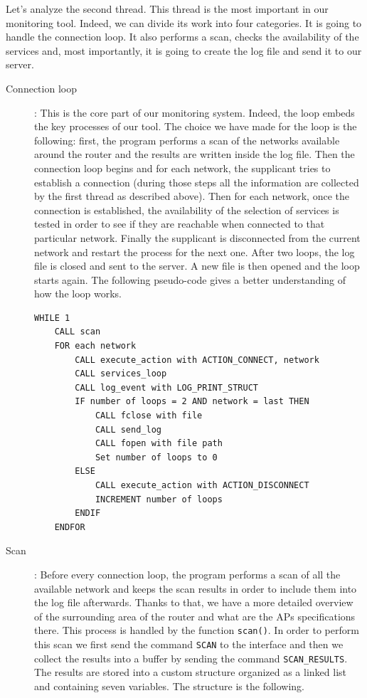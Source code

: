 Let's analyze the second thread. This thread is the most important in our monitoring tool. Indeed, we can divide its work into four categories. It is going to handle the connection loop. It also performs a scan, checks the availability of the services and, most importantly, it is going to create the log file and send it to our server. 

\begin{description}
	\item[Connection loop]: This is the core part of our monitoring system. Indeed, the loop embeds the key processes of our tool. The choice we have made for the loop is the following: first, the program performs a scan of the networks available around the router and the results are written inside the log file. Then the connection loop begins and for each network, the supplicant tries to establish a connection (during those steps all the information are collected by the first thread as described above). Then for each network, once the connection is established, the availability of the selection of services is tested in order to see if they are reachable when connected to that particular network. Finally the supplicant is disconnected from the current network and restart the process for the next one. After two loops, the log file is closed and sent to the server. A new file is then opened and the loop starts again. The following pseudo-code gives a better understanding of how the loop works.\\

\begin{lstlisting}[frame=single,breaklines=true,caption={Connection loop pseudo-code}]
WHILE 1
	CALL scan
	FOR each network
		CALL execute_action with ACTION_CONNECT, network
		CALL services_loop
		CALL log_event with LOG_PRINT_STRUCT
		IF number of loops = 2 AND network = last THEN
			CALL fclose with file
			CALL send_log
			CALL fopen with file path
			Set number of loops to 0
		ELSE
			CALL execute_action with ACTION_DISCONNECT
			INCREMENT number of loops
		ENDIF
	ENDFOR
\end{lstlisting}

	\item[Scan]: Before every connection loop, the program performs a scan of all the available network and keeps the scan results in order to include them into the log file afterwards. Thanks to that, we have a more detailed overview of the surrounding area of the router and what are the APs specifications there. This process is handled by the function \texttt{scan()}. In order to perform this scan we first send the command \texttt{SCAN} to the interface and then we collect the results into a buffer by sending the command \texttt{SCAN\_RESULTS}. The results are stored into a custom structure organized as a linked list and containing seven variables. The structure is the following.\\


\end{description}
